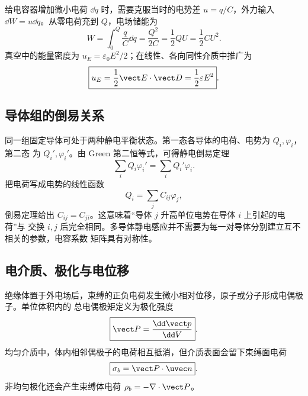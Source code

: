 \seriesParallelDiagram

给电容器增加微小电荷 $\dd q$ 时，需要克服当时的电势差 $u=q/C$，外力输入
$\dd W=u\dd q$。从零电荷充到 $Q$，电场储能为
\begin{equation}
  \boxed{W=\int_0^Q\frac qC\dd q
  =\frac{Q^2}{2C}=\frac12QU=\frac12CU^2}.
\end{equation}
真空中的能量密度为 $u_E=\varepsilon_0E^2/2$；在线性、各向同性介质中推广为
\begin{equation}
  \boxed{u_E=\frac12\vect E\cdot\vect D=\frac12\varepsilon E^2}.
\end{equation}

\subsection*{导体组的倒易关系}

同一组固定导体可处于两种静电平衡状态。第一态各导体的电荷、电势为 $Q_i,\varphi_i$，第二态
为 $Q_i',\varphi_i'$。由 Green 第二恒等式，可得静电倒易定理
\begin{equation}
  \boxed{\sum_iQ_i\varphi_i'=\sum_iQ_i'\varphi_i}.
\end{equation}
把电荷写成电势的线性函数
\begin{equation}
  Q_i=\sum_jC_{ij}\varphi_j,
\end{equation}
倒易定理给出 $C_{ij}=C_{ji}$。这意味着“导体 $j$ 升高单位电势在导体 $i$ 上引起的电荷”与
交换 $i,j$ 后完全相同。多导体静电感应并不需要为每一对导体分别建立互不相关的参数，电容系数
矩阵具有对称性。

\subsection*{电介质、极化与电位移}

绝缘体置于外电场后，束缚的正负电荷发生微小相对位移，原子或分子形成电偶极子。单位体积内的
总电偶极矩定义为极化强度
\begin{equation}
  \boxed{\vect P=\frac{\dd\vect p}{\dd V}}.
\end{equation}
均匀介质中，体内相邻偶极子的电荷相互抵消，但介质表面会留下束缚面电荷
\begin{equation}
  \boxed{\sigma_b=\vect P\cdot\uvec n}.
\end{equation}
非均匀极化还会产生束缚体电荷 $\rho_b=-\nabla\cdot\vect P$。

\polarizationDiagram

